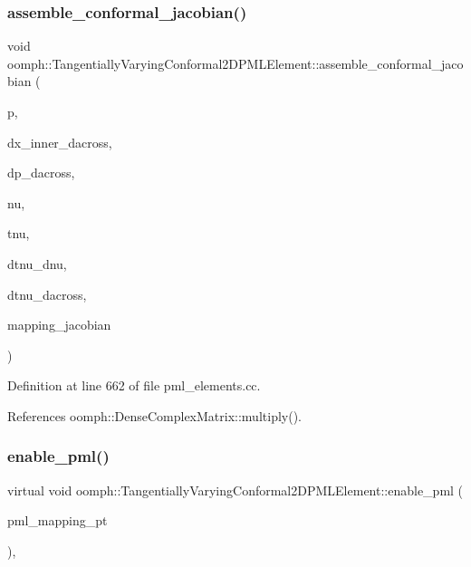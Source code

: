 \subsubsection{\texorpdfstring{assemble\+\_\+conformal\+\_\+jacobian()}{assemble\_conformal\_jacobian()}}
{\footnotesize\ttfamily void oomph\+::\+Tangentially\+Varying\+Conformal2\+D\+P\+M\+L\+Element\+::assemble\+\_\+conformal\+\_\+jacobian (\begin{DoxyParamCaption}\item[{const \hyperlink{classoomph_1_1Vector}{Vector}$<$ double $>$ \&}]{p,  }\item[{const \hyperlink{classoomph_1_1Vector}{Vector}$<$ double $>$ \&}]{dx\+\_\+inner\+\_\+dacross,  }\item[{const \hyperlink{classoomph_1_1Vector}{Vector}$<$ double $>$ \&}]{dp\+\_\+dacross,  }\item[{const double \&}]{nu,  }\item[{const std\+::complex$<$ double $>$ \&}]{tnu,  }\item[{const std\+::complex$<$ double $>$ \&}]{dtnu\+\_\+dnu,  }\item[{const std\+::complex$<$ double $>$ \&}]{dtnu\+\_\+dacross,  }\item[{\hyperlink{classoomph_1_1DenseComplexMatrix}{Dense\+Complex\+Matrix} \&}]{mapping\+\_\+jacobian }\end{DoxyParamCaption})}



Definition at line 662 of file pml\+\_\+elements.\+cc.



References oomph\+::\+Dense\+Complex\+Matrix\+::multiply().

\mbox{\label{classoomph_1_1TangentiallyVaryingConformal2DPMLElement_ac8b6cad9a9b917809dc3e5e60653bd7b}} 
\subsubsection{\texorpdfstring{enable\+\_\+pml()}{enable\_pml()}}
{\footnotesize\ttfamily virtual void oomph\+::\+Tangentially\+Varying\+Conformal2\+D\+P\+M\+L\+Element\+::enable\+\_\+pml (\begin{DoxyParamCaption}\item[{\hyperlink{classoomph_1_1TangentiallyVaryingConformalPMLMapping}{Tangentially\+Varying\+Conformal\+P\+M\+L\+Mapping} $\ast$}]{pml\+\_\+mapping\+\_\+pt }\end{DoxyParamCaption})\hspace{0.3cm}{\ttfamily [inline]}, {\ttfamily [virtual]}}



